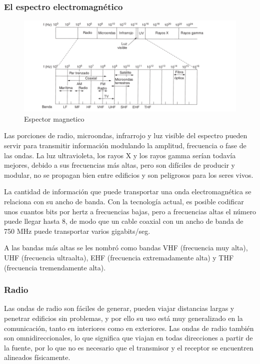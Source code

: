 \subsubsection*{El espectro electromagnético}
\begin{figure}[H]
	\centering
	\includegraphics[width=\textwidth
]{images/espectro-magnetico.png}
	\caption[Espector magnetico]{Espector magnetico}
	\label{fig:espectro-magnetico}
\end{figure}

Las porciones de radio, microondas, infrarrojo y luz visible del espectro pueden servir para transmitir información modulando la amplitud, frecuencia o fase de las ondas. La luz ultravioleta, los rayos X y los rayos gamma serían todavía mejores, debido a sus frecuencias más altas, pero son difíciles de producir y modular, no se propagan bien entre edificios y son peligrosos para los seres vivos. 

La cantidad de información que puede transportar una onda electromagnética se relaciona con su ancho de banda. Con la tecnología actual, es posible codificar unos cuantos bits por hertz a frecuencias bajas, pero a frecuencias altas el número puede llegar hasta 8, de modo que un cable coaxial con un ancho de banda de 750 MHz puede transportar varios gigabits/seg.

A las bandas más altas se les nombró como bandas VHF (frecuencia muy alta), UHF (frecuencia ultraalta), EHF (frecuencia extremadamente alta) y THF (frecuencia tremendamente alta).

\subsubsection*{Radio}
Las ondas de radio son fáciles de generar, pueden viajar distancias largas y penetrar edificios sin problemas, y por ello su uso está muy generalizado en la comunicación, tanto en interiores como en exteriores. Las ondas de radio también son  omnidireccionales, lo que significa que viajan en todas direcciones a partir de la fuente, por lo que no es necesario que el transmisor y el receptor se encuentren alineados físicamente.

